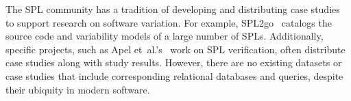 \begin{comment}
--------------------------------------------------------------------------------------
* uses views to choose the subset of global schema per variant
* view integration or view merging ~\cite{sp94tkde, parsons02jmis, bln86acmcs}:
focuses on consistency checking, covering different, incomplete, and 
overlapping aspects in local view to retrieve one valid global view or sch.
* or view tailoring~\cite{bqr07cmer} aims at generating and composing views to
tailor the data of an underlying database schema for a given context. 
* View-based approaches~\cite{bqr07cmer} generate views on top of the global schema that emulate a schema variant for the client, which may be seen as an annotative approach. Thus, the global schema is still part of every DB schema vari- ant, the approach inherits the problems of the global schema. Unfortunately, the vari- ant?s schema complexity does even increase, because the additional schema elements for the view, emulating the variant, have to be included as well. Furthermore, there is additional effort to generate views when modeling the DB schema. This approach has benefits in data integrity, because the views emulating the schema variants can contain additional integrity constraints, which cannot be included into the global schema. Thus, the expressiveness of the model is also better than in the global schema approach



\end{comment}

The SPL community has a tradition of developing and distributing case studies
to support research on software variation. For example, SPL2go~\cite{SPL2go}
catalogs the source code and variability models of a large number of SPLs.
Additionally, specific projects, such as Apel
et~al.'s~\cite{apel2013strategies} work on SPL verification, often distribute
case studies along with study results.
%
However, there are no existing datasets or case studies that include
corresponding relational databases and queries, despite their ubiquity in modern software.


